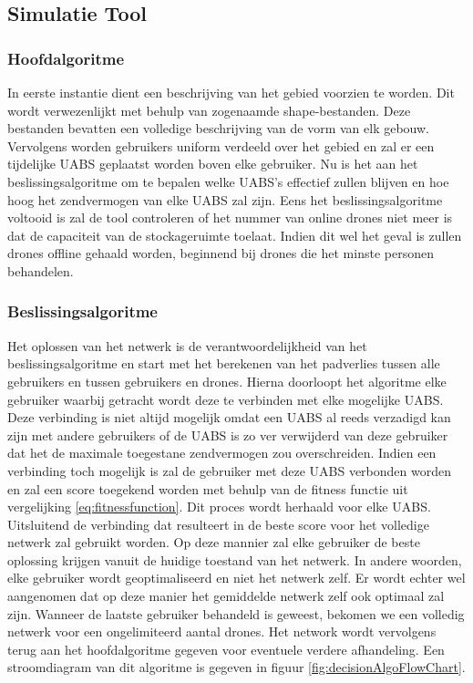 \documentclass[twocolumn]{phdsymp_dutch}
\begin{document}
\subsection{Simulatie Tool}

\subsubsection{Hoofdalgoritme}
In eerste instantie dient een beschrijving van het gebied voorzien te worden. Dit wordt verwezenlijkt met behulp van 
zogenaamde shape-bestanden. Deze bestanden bevatten een volledige beschrijving van de vorm van elk gebouw. Vervolgens 
worden gebruikers uniform verdeeld over het gebied en zal er een tijdelijke \gls{UABS} geplaatst worden boven elke gebruiker.
Nu is het aan het beslissingsalgoritme om te bepalen welke \gls{UABS}'s effectief zullen blijven en hoe hoog het zendvermogen van elke \gls{UABS}
zal zijn. Eens het beslissingsalgoritme voltooid is zal de tool controleren of het nummer van online drones niet meer is dat 
de capaciteit van de stockageruimte toelaat. Indien dit wel het geval is zullen drones offline gehaald worden, beginnend bij 
drones die het minste personen behandelen.

\subsubsection{Beslissingsalgoritme}

Het oplossen van het netwerk is de verantwoordelijkheid van het beslissingsalgoritme en start met het berekenen van het padverlies tussen 
alle gebruikers en tussen gebruikers en drones. Hierna doorloopt het algoritme elke gebruiker waarbij getracht wordt deze te verbinden 
met elke mogelijke \gls{UABS}. Deze verbinding is niet altijd mogelijk omdat een \gls{UABS} al reeds verzadigd kan zijn met andere gebruikers of 
de \gls{UABS} is zo ver verwijderd van deze gebruiker dat het de maximale toegestane zendvermogen zou overschreiden.
Indien een verbinding toch mogelijk is zal de gebruiker met deze \gls{UABS} verbonden worden en zal een score toegekend worden met behulp van 
de fitness functie uit vergelijking \ref{eq:fitnessfunction}. 
Dit proces wordt herhaald voor elke \gls{UABS}. Uitsluitend de verbinding dat resulteert in de beste score voor het volledige netwerk 
zal gebruikt worden. 
Op deze mannier zal elke gebruiker de beste oplossing krijgen vanuit de huidige toestand van het netwerk.
In andere woorden, elke gebruiker wordt geoptimaliseerd en niet het netwerk zelf. Er wordt echter wel aangenomen dat 
op deze manier het gemiddelde netwerk zelf ook optimaal zal zijn.
Wanneer de laatste gebruiker behandeld is geweest, bekomen we een volledig netwerk voor een ongelimiteerd aantal drones.
Het network wordt vervolgens terug aan het hoofdalgoritme gegeven voor eventuele verdere afhandeling.
Een stroomdiagram van dit algoritme is gegeven in figuur \ref{fig:decisionAlgoFlowChart}.
\end{document}
